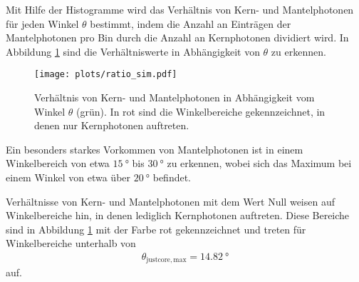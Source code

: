 Mit Hilfe der Histogramme wird das Verhältnis von Kern- und Mantelphotonen für jeden Winkel $\theta$ bestimmt, indem die Anzahl an Einträgen der Mantelphotonen pro Bin durch die Anzahl an Kernphotonen dividiert wird. In Abbildung \ref{fig:ratio_sim} sind die Verhältniswerte in Abhängigkeit von $\theta$ zu erkennen.
\begin{figure}
    \centering
    \texttt{[image: plots/ratio\_sim.pdf]}
    \caption{Verhältnis von Kern- und Mantelphotonen in Abhängigkeit vom Winkel $\theta$ (grün). In rot sind die Winkelbereiche gekennzeichnet, in denen nur Kernphotonen auftreten.}
    \label{fig:ratio_sim}
\end{figure}
\FloatBarrier
Ein besonders starkes Vorkommen von Mantelphotonen ist in einem Winkelbereich von etwa $\SI{15}{°}$ bis $\SI{30}{°}$ zu erkennen, wobei sich das Maximum bei einem Winkel von etwa über $\SI{20}{°}$ befindet.

Verhältnisse von Kern- und Mantelphotonen mit dem Wert Null weisen auf Winkelbereiche hin, in denen lediglich Kernphotonen auftreten. Diese Bereiche sind in Abbildung \ref{fig:ratio_sim} mit der Farbe rot gekennzeichnet und treten für Winkelbereiche unterhalb von
\begin{align*}
    \theta_{\mathrm{just core, max}} = \SI{14.82}{°}
\end{align*}
auf. \\

